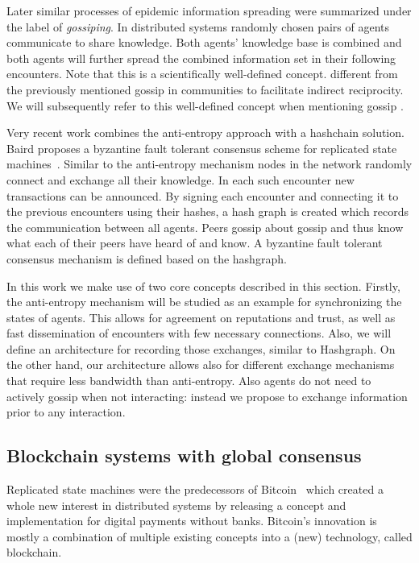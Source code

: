Later similar processes of epidemic information spreading were summarized under the label of 
\textit{gossiping}. In distributed systems randomly chosen pairs of agents communicate to share 
knowledge. Both agents' knowledge base is combined and both agents will further spread the combined
information set in their following encounters. Note that this is a scientifically well-defined 
concept. different from the previously mentioned gossip in communities to facilitate indirect reciprocity.
We will subsequently refer to this well-defined concept when mentioning gossip \cite{hedetniemi1988survey}.

Very recent work combines the anti-entropy approach with a hashchain solution. Baird proposes a 
byzantine fault tolerant consensus scheme for replicated state machines~\cite{baird2016swirlds}. Similar
to the anti-entropy mechanism nodes in the network randomly connect and exchange all their knowledge. In each
such encounter new transactions can be announced. By signing each encounter and connecting it to the
previous encounters using their hashes, a hash graph is created which records the communication 
between all agents. Peers gossip about gossip and thus know what each of their peers have heard of and
know. A byzantine fault tolerant consensus mechanism is defined based on the hashgraph.

In this work we make use of two core concepts described in this section. Firstly, the anti-entropy
mechanism will be studied as an example for synchronizing the states of agents. This allows for 
agreement on reputations and trust, as well as fast dissemination of encounters with few necessary
connections. Also, we will define an architecture for recording those exchanges, similar to Hashgraph.
On the other hand, our architecture allows also for different exchange mechanisms that require less
bandwidth than anti-entropy. Also agents do not need to actively gossip when not interacting: instead
we propose to exchange information prior to any interaction.

\subsection{Blockchain systems with global consensus}
Replicated state machines were the predecessors of Bitcoin~\cite{nakamoto2008bitcoin} which created 
a whole new interest in distributed systems by releasing a concept and implementation for digital payments 
without banks. Bitcoin's innovation is mostly a combination of multiple existing concepts into a (new) technology, called blockchain.

